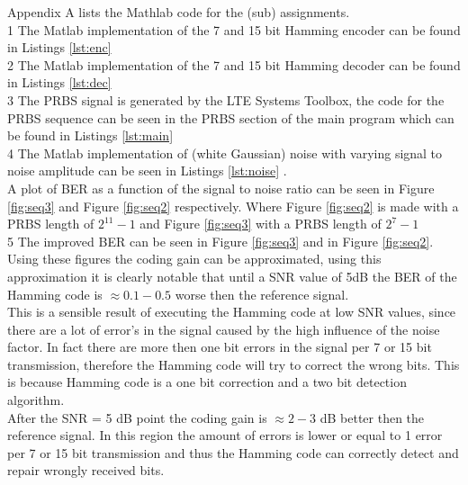 \documentclass[12pt]{article}
\begin{document}
\maketitle
\noindent Appendix A lists the Mathlab code for the (sub) assignments.\\




  \setlength{\parskip}{0pt}
1 The Matlab implementation of the 7 and 15 bit Hamming encoder can be found in Listings \ref{lst:enc} \\


2 The Matlab implementation of the 7 and 15 bit Hamming decoder can be found in Listings \ref{lst:dec}\\



3 The PRBS signal is generated by the LTE Systems Toolbox, the code for the PRBS sequence can be seen in the PRBS section of the main program which can be found in Listings \ref{lst:main}\\



4 The Matlab implementation of (white Gaussian) noise with varying  signal to noise amplitude can be seen in Listings \ref{lst:noise} .\\
A plot of BER as a function of the signal to noise ratio can be seen in Figure \ref{fig:seq3} and  Figure \ref{fig:seq2} respectively.
Where Figure \ref{fig:seq2} is made with a PRBS length of $2^{11}-1 $ and Figure \ref{fig:seq3} with a PRBS length of $2^{7}-1 $ \\


5 The improved BER can be seen in Figure \ref{fig:seq3} and in Figure \ref{fig:seq2}.\\ %
Using these figures the coding gain can be approximated, using this approximation it is clearly notable  that until a SNR value of 5dB the BER of the Hamming code is $ \approx 0.1 - 0.5 $ worse then the reference signal.\\
This is a sensible result of executing the Hamming code at low SNR values, since there are a lot of error's in the signal caused by the high influence of the noise factor. In fact there are more then one bit errors  in the signal per 7 or 15 bit transmission, therefore the Hamming code will try to correct the wrong bits.
This is because Hamming code is a one bit correction and a two bit detection algorithm. \\
After the SNR = 5 dB point the coding gain is $ \approx 2-3 $ dB better then the reference signal.
In this region the amount of errors is lower or equal to 1 error per 7 or 15 bit transmission and thus the Hamming code can correctly detect and repair wrongly received bits.\\
\end{document}
